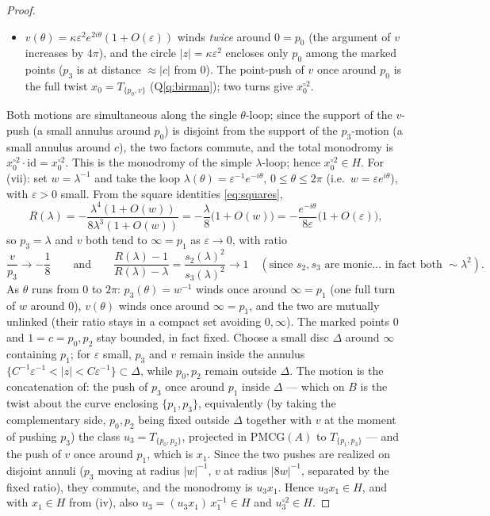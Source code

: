 \documentclass[11pt]{article}
\theoremstyle{definition}
\theoremstyle{remark}
\newcommand{\PMCG}{\mathrm{PMCG}}
\begin{document}
\begin{proof}
\begin{itemize}
trivial mapping class.
\item $v(\theta)=\kappa\varepsilon^2 e^{2i\theta}(1+O(\varepsilon))$
winds \emph{twice} around $0=p_0$ (the argument of $v$ increases by
$4\pi$), and the circle $|z|=\kappa\varepsilon^2$ encloses only $p_0$
among the marked points ($p_3$ is at distance $\approx|c|$ from $0$).
The point-push of $v$ once around $p_0$ is the full twist
$x_0=T_{\{p_0,v\}}$ (Q\ref{q:birman}); two turns give $x_0^{\circ2}$.
\end{itemize}
Both motions are simultaneous along the single $\theta$-loop; since the
support of the $v$-push (a small annulus around $p_0$) is disjoint from
the support of the $p_3$-motion (a small annulus around $c$), the two
factors commute, and the total monodromy is
$x_0^{\circ2}\cdot\mathrm{id}=x_0^{\circ2}$.  This is the monodromy of
the simple $\lambda$-loop; hence $x_0^{\circ2}\in H$.
For (vii): set $w=\lambda^{-1}$ and take the loop
$\lambda(\theta)=\varepsilon^{-1}e^{-i\theta}$, $0\le\theta\le2\pi$
(i.e.\ $w=\varepsilon e^{i\theta}$), with $\varepsilon>0$ small.  From
the square identities \eqref{eq:squares},
\[
R(\lambda)=-\frac{\lambda^4(1+O(w))}{8\lambda^3(1+O(w))}
=-\frac{\lambda}{8}\bigl(1+O(w)\bigr)
=-\frac{e^{-i\theta}}{8\varepsilon}\bigl(1+O(\varepsilon)\bigr),
\]
so $p_3=\lambda$ and $v$ both tend to $\infty=p_1$ as
$\varepsilon\to0$, with ratio
\[
\frac{v}{p_3}\longrightarrow-\frac18
\qquad\text{and}\qquad
\frac{R(\lambda)-1}{R(\lambda)-\lambda}
=\frac{s_2(\lambda)^2}{s_3(\lambda)^2}\longrightarrow1
\quad(\text{since }s_2,s_3\text{ are monic}\ldots\text{ in fact both }
\sim\lambda^2).
\]
As $\theta$ runs from $0$ to $2\pi$: $p_3(\theta)=w^{-1}$ winds once
around $\infty=p_1$ (one full turn of $w$ around $0$), $v(\theta)$
winds once around $\infty=p_1$, and the two are mutually unlinked
(their ratio stays in a compact set avoiding $0,\infty$).  The marked
points $0$ and $1=c=p_0,p_2$ stay bounded, in fact fixed.  Choose a
small disc $\Delta$ around $\infty$ containing $p_1$; for
$\varepsilon$ small, $p_3$ and $v$ remain inside the annulus
$\{C^{-1}\varepsilon^{-1}<|z|<C\varepsilon^{-1}\}\subset\Delta$, while
$p_0,p_2$ remain outside $\Delta$.  The motion is the concatenation of:
the push of $p_3$ once around $p_1$ inside $\Delta$ — which on $B$
is the twist about the curve enclosing $\{p_1,p_3\}$, equivalently
(by taking the complementary side, $p_0,p_2$ being fixed outside
$\Delta$ together with $v$ at the moment of pushing $p_3$) the class
$u_3=T_{\{p_0,p_2\}}$, projected in $\PMCG(A)$ to
$T_{\{p_1,p_3\}}$ — and the push of $v$ once around $p_1$, which is
$x_1$.  Since the two pushes are realized on disjoint annuli
($p_3$ moving at radius $|w|^{-1}$, $v$ at radius
$|8w|^{-1}$, separated by the fixed ratio), they commute, and the
monodromy is $u_3x_1$.  Hence $u_3x_1\in H$, and with $x_1\in H$
from (iv), also $u_3=(u_3x_1)\,x_1^{-1}\in H$ and $u_3^{\circ2}\in H$.
\end{proof}
\end{document}
